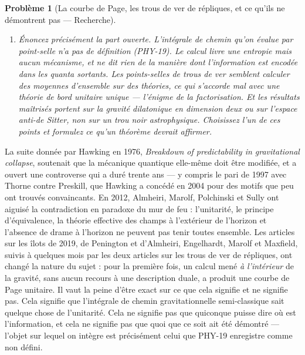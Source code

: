 \documentclass[11pt]{article}
\newtheorem{problem}{Problème}
\begin{document}
\begin{problem}[{La courbe de Page, les trous de ver de répliques, et ce qu'ils ne démontrent pas --- Recherche}]
\begin{enumerate}
revient.
\item[(d)] Énoncez précisément la part ouverte. L'intégrale de chemin qu'on évalue par point-selle n'a pas
de définition (PHY-19). Le calcul livre une entropie mais aucun mécanisme, et ne dit rien de la
manière dont l'information est encodée dans les quanta sortants. Les points-selles de trous de ver
semblent calculer des moyennes d'ensemble sur des théories, ce qui s'accorde mal avec une théorie
de bord unitaire unique --- l'énigme de la factorisation. Et les résultats maîtrisés portent sur la
gravité dilatonique en dimension deux ou sur l'espace anti-de Sitter, non sur un trou noir
astrophysique. Choisissez l'un de ces points et formulez ce qu'un théorème devrait affirmer.
\end{enumerate}

\end{problem}

\noindent La suite donnée par Hawking en 1976, \textit{Breakdown of predictability in
gravitational collapse}, soutenait que la mécanique quantique elle-même doit être modifiée, et
a ouvert une controverse qui a duré trente ans --- y compris le pari de 1997 avec Thorne contre
Preskill, que Hawking a concédé en 2004 pour des motifs que peu ont trouvés convaincants. En 2012,
Almheiri, Marolf, Polchinski et Sully ont aiguisé la contradiction en paradoxe du mur de feu :
l'unitarité, le principe d'équivalence, la théorie effective des champs à l'extérieur de l'horizon
et l'absence de drame à l'horizon ne peuvent pas tenir toutes ensemble. Les articles sur les îlots
de 2019, de Penington et d'Almheiri, Engelhardt, Marolf et Maxfield, suivis à quelques mois par les
deux articles sur les trous de ver de répliques, ont changé la nature du sujet : pour la première
fois, un calcul mené \textit{à l'intérieur} de la gravité, sans aucun recours à une description
duale, a produit une courbe de Page unitaire. Il vaut la peine d'être exact sur ce que cela
signifie et ne signifie pas. Cela signifie que l'intégrale de chemin gravitationnelle
semi-classique sait quelque chose de l'unitarité. Cela ne signifie pas que quiconque puisse dire
où est l'information, et cela ne signifie pas que quoi que ce soit ait été démontré --- l'objet sur
lequel on intègre est précisément celui que PHY-19 enregistre comme non défini.
\end{document}
